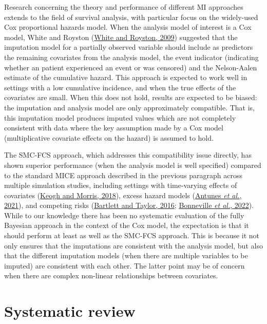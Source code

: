 \documentclass[
  letterpaper,
  DIV=11,
  numbers=noendperiod]{scrreprt}
\begin{document}
Research concerning the theory and performance of different MI
approaches extends to the field of survival analysis, with particular
focus on the widely-used Cox proportional hazards model. When the
analysis model of interest is a Cox model, White and Royston
(\protect\hyperlink{ref-whiteImputingMissingCovariate2009}{White and
Royston, 2009}) suggested that the imputation model for a partially
observed variable should include as predictors the remaining covariates
from the analysis model, the event indicator (indicating whether an
patient experienced an event or was censored) and the Nelson-Aalen
estimate of the cumulative hazard. This approach is expected to work
well in settings with a low cumulative incidence, and when the true
effects of the covariates are small. When this does not hold, results
are expected to be biased: the imputation and analysis model are only
approximately compatible. That is, this imputation model produces
imputed values which are not completely consistent with data where the
key assumption made by a Cox model (multiplicative covariate effects on
the hazard) is assumed to hold.

The SMC-FCS approach, which addresses this compatibility issue directly,
has shown superior performance (when the analysis model is well
specified) compared to the standard MICE approach described in the
previous paragraph across multiple simulation studies, including
settings with time-varying effects of covariates
(\protect\hyperlink{ref-keoghMultipleImputationCox2018}{Keogh and
Morris, 2018}), excess hazard models
(\protect\hyperlink{ref-antunesDealingMissingInformation2021}{Antunes
\emph{et al.}, 2021}), and competing risks
(\protect\hyperlink{ref-bartlettMissingCovariatesCompeting2016}{Bartlett
and Taylor, 2016};
\protect\hyperlink{ref-bonnevilleMultipleImputationCausespecific2022}{Bonneville
\emph{et al.}, 2022}). While to our knowledge there has been no
systematic evaluation of the fully Bayesian approach in the context of
the Cox model, the expectation is that it should perform at least as
well as the SMC-FCS approach. This is because it not only ensures that
the imputations are consistent with the analysis model, but also that
the different imputation models (when there are multiple variables to be
imputed) are consistent with each other. The latter point may be of
concern when there are complex non-linear relationships between
covariates.

\hypertarget{systematic-review}{%
\section{Systematic review}\label{systematic-review}}
\end{document}
